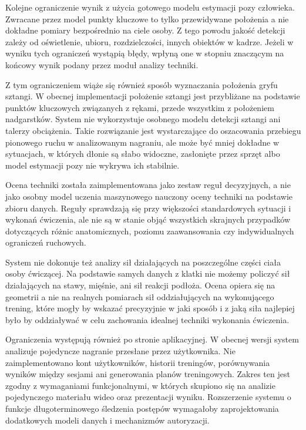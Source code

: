 Kolejne ograniczenie wynik z użycia gotowego modelu estymacji pozy człowieka. Zwracane przez model punkty kluczowe to tylko przewidywane położenia a nie dokładne pomiary bezpośrednio na ciele osoby. Z tego powodu jakość detekcji zależy od oświetlenie, ubioru, rozdzielczości, innych obiektów w kadrze. Jeżeli w wyniku tych ograniczeń wystąpią błędy, wpłyną one w stopniu znaczącym na końcowy wynik podany przez moduł analizy techniki.

Z tym ograniczeniem wiąże się również sposób wyznaczania położenia gryfu sztangi. W obecnej implementacji położenie sztangi jest przybliżane na podstawie punktów kluczowych związanych z rękami, przede wszystkim z położeniem nadgarstków. System nie wykorzystuje osobnego modelu detekcji sztangi ani talerzy obciążenia. Takie rozwiązanie jest wystarczające do oszacowania przebiegu pionowego ruchu w analizowanym nagraniu, ale może być mniej dokładne w sytuacjach, w których dłonie są słabo widoczne, zasłonięte przez sprzęt albo model estymacji pozy nie wykrywa ich stabilnie.

Ocena techniki została zaimplementowana jako zestaw reguł decyzyjnych, a nie jako osobny model uczenia maszynowego nauczony oceny techniki na podstawie zbioru danych. Reguły sprawdzają się przy większości standardowych sytuacji i wykonań ćwiczenia, ale nie są w stanie objąć wszystkich skrajnych przypadków dotyczących różnic anatomicznych, poziomu zaawansowania czy indywidualnych ograniczeń ruchowych. 

System nie dokonuje też analizy sił działających na poszczególne części ciała osoby ćwiczącej. Na podstawie samych danych z klatki nie możemy policzyć sił działających na stawy, mięśnie, ani sił reakcji podłoża. Ocena opiera się na geometrii a nie na realnych pomiarach sił oddziałujących na wykonującego trening, które mogły by wskazać precyzyjnie w jaki sposób i z jaką siła najlepiej było by oddziaływać w celu zachowania idealnej techniki wykonania ćwiczenia. 

Ograniczenia występują również po stronie aplikacyjnej. W obecnej wersji system analizuje pojedyncze nagranie przesłane przez użytkownika. Nie zaimplementowano kont użytkowników, historii treningów, porównywania wyników między sesjami ani generowania planów treningowych. Zakres ten jest zgodny z wymaganiami funkcjonalnymi, w których skupiono się na analizie pojedynczego materiału wideo oraz prezentacji wyniku. Rozszerzenie systemu o funkcje długoterminowego śledzenia postępów wymagałoby zaprojektowania dodatkowych modeli danych i mechanizmów autoryzacji.

